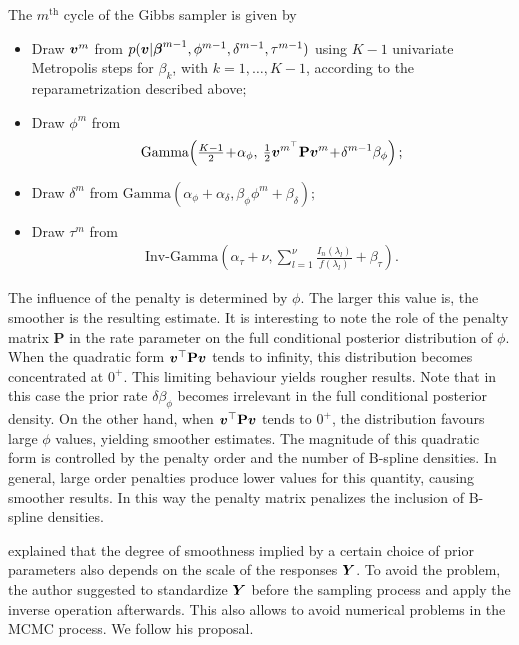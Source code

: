 \documentclass[twocolumn,final]{svjour3}
\newcommand{\bm}[1]{\mbox{\boldmath $#1$}}
\begin{document}
The $m^{\text{th}}$ cycle of the Gibbs sampler is given by
\begin{itemize}
	\item Draw $\bm{v}^{m}$ from $p(\bm{v}|\bm{\beta}^{m-1},\phi^{m-1},\delta^{m-1},\tau^{m-1})$ using $K-1$ univariate Metropolis steps for $\beta_k$, with $k=1,\dots,K-1$, according to the reparametrization described above;
	\item Draw $\phi^{m}$ from 
	\begin{align*}
	\text{Gamma}\!\left(\tfrac{K-1}{2}\!+\!\alpha_{\phi},\: \tfrac{1}{2} \bm{v}^{m^\top} \textbf{P} \bm{v}^{m}\!+\!\delta^{m-1} \beta_{\phi} \right);
	\end{align*}
	
	\item Draw $\delta^{m}$ from $\text{Gamma}\left(\alpha_{\phi} + \alpha_{\delta}, \beta_{\phi} \phi^{m} + \beta_{\delta}\right);$ 
	\item Draw $\tau^{m}$ from 
	\begin{align*}
	\text{Inv-Gamma}\!\left(\alpha_{\tau}\!+\!\nu, {\textstyle\sum\limits_{l=1}^{\nu}} \tfrac{I_n(\lambda_l)}{f(\lambda_l)} + \beta_{\tau} \right) .
	\end{align*}
\end{itemize}

The influence of the penalty is determined by $\phi$.  The larger this value is, the smoother is the resulting estimate. %
It is interesting to note the role of the penalty matrix  \textbf{P} in the rate parameter on the full conditional posterior distribution of $\phi$.  When the quadratic form $\bm{v}^\top \textbf{P} \bm{v}$ tends to infinity, this distribution becomes concentrated at $0^{+}$.  This limiting behaviour yields rougher results.  Note that in this case the prior rate $\delta\beta_{\phi}$ becomes irrelevant in the full conditional posterior density.  On the other hand, when $\bm{v}^\top \textbf{P} \bm{v}$ tends to $0^{+}$, the distribution favours large $\phi$ values, yielding smoother estimates.  
%
The magnitude of this quadratic form is controlled by the penalty order and the number of B-spline densities.  In general, large order penalties produce lower values for this quantity, causing smoother results.  In this way the penalty matrix penalizes the inclusion of B-spline densities.

\cite{Ruppert2002} explained that the degree of smoothness implied by a certain choice of prior parameters also depends on the scale of the responses $\bm{Y}$.  To avoid the problem, the author suggested to standardize $\bm{Y}$ before the sampling process and apply the inverse operation afterwards.  This also allows to avoid numerical problems in the MCMC process.  We follow his proposal.
\end{document}
